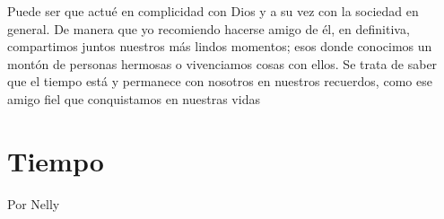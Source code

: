 \documentclass[11pt,twoside,openright,a5paper]{book}
\begin{document}
Puede ser que actué en complicidad con Dios y a su vez con la sociedad en general. De manera que yo recomiendo hacerse amigo de él, en definitiva, compartimos juntos nuestros más lindos momentos; esos donde conocimos un montón de personas hermosas o vivenciamos cosas con ellos. Se trata de saber que el tiempo está y permanece con nosotros en nuestros recuerdos, como ese amigo fiel que conquistamos en nuestras vidas

\section*{Tiempo}
                                                                                                            \begin{flushright}Por Nelly\end{flushright}
\end{document}
